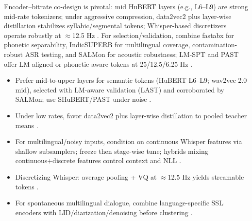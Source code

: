 \documentclass{article}
\begin{document}
Encoder--bitrate co-design is pivotal: mid HuBERT layers (e.g., L6--L9) are strong mid-rate tokenizers; under aggressive compression, data2vec2 plus layer-wise distillation stabilizes syllabic/segmental tokens; Whisper-based discretizers operate robustly at $\approx$12.5 Hz \cite{wu2024speechcomposerunifyingmultiplespeechtask,baade2024syllablelmlearningcoarsesemanticunitsspe,zeng2024scalingspeechtextpretrainingsyntheticint}. For selection/validation, combine fastabx for phonetic separability, IndicSUPERB for multilingual coverage, contamination-robust ASR testing, and SALMon for acoustic robustness; LM-SPT and PAST offer LM-aligned or phonetic-aware tokens at 25/12.5/6.25 Hz \cite{poli2025fastabxlibraryefficientcomputationabxdis,entry2025indicsuperbspeechprocessinguniversalperf,tseng2025evaluationllmsspeechisoftenflawedtestset,maimon2025salmonsuiteacousticlanguagemodelevaluati,jo2025lmsptalignedsemanticdistillationspeechto,har-tuv2025pastphoneticacousticspeechtokenizer}.

\begin{itemize}
  \item Prefer mid-to-upper layers for semantic tokens (HuBERT L6--L9; wav2vec 2.0 mid), selected with LM-aware validation (LAST) and corroborated by SALMon; use SHuBERT/PAST under noise \cite{turetzky2024lastlanguagemodelawarespeechtokenization,maimon2025salmonsuiteacousticlanguagemodelevaluati,entry2025selectivehubertselfsupervisedpretraining,har-tuv2025pastphoneticacousticspeechtokenizer,chen2023reducingbarriersselfsupervisedlearninghu}.
  \item Under low rates, favor data2vec2 plus layer-wise distillation to pooled teacher means \cite{baade2024syllablelmlearningcoarsesemanticunitsspe}.
  \item For multilingual/noisy inputs, condition on continuous Whisper features via shallow subsamplers; freeze then stage-wise tune; hybrids mixing continuous+discrete features control context and NLL \cite{verma2024whispergpthybridrepresentationaudiolarge,nguyen2025qwenvsgemmaintegrationwhispercomparative,li2025transsionmultilingualspeechrecognitionsy}.
  \item Discretizing Whisper: average pooling + VQ at $\approx$12.5 Hz yields streamable tokens \cite{zeng2024scalingspeechtextpretrainingsyntheticint}.
  \item For spontaneous multilingual dialogue, combine language-specific SSL encoders with LID/diarization/denoising before clustering \cite{nakata2024jchatjapaneselargescalespokendialoguecor}.
\end{itemize}
\end{document}
